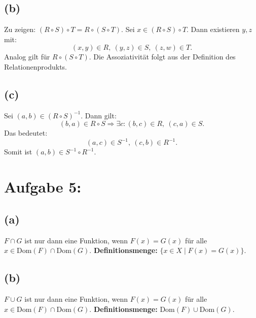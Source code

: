 \documentclass[a4paper]{scrartcl}
\begin{document}
\subsection*{(b)}
Zu zeigen: \((R \circ S) \circ T = R \circ (S \circ T)\).  
Sei \( x \in (R \circ S) \circ T \). Dann existieren \( y, z \) mit:
\[
(x, y) \in R, \ (y, z) \in S, \ (z, w) \in T.
\]
Analog gilt für \( R \circ (S \circ T) \). Die Assoziativität folgt aus der Definition des Relationenprodukts.

\subsection*{(c)}
Sei \( (a, b) \in (R \circ S)^{-1} \). Dann gilt:
\[
(b, a) \in R \circ S \Rightarrow \exists c: (b, c) \in R, \ (c, a) \in S.
\]
Das bedeutet:
\[
(a, c) \in S^{-1}, \ (c, b) \in R^{-1}.
\]
Somit ist \( (a, b) \in S^{-1} \circ R^{-1} \).

\section*{Aufgabe 5:}

\subsection*{(a)}
\( F \cap G \) ist nur dann eine Funktion, wenn \( F(x) = G(x) \) für alle \( x \in \text{Dom}(F) \cap \text{Dom}(G) \).  
\textbf{Definitionsmenge:} \( \{x \in X \mid F(x) = G(x)\} \).

\subsection*{(b)}
\( F \cup G \) ist nur dann eine Funktion, wenn \( F(x) = G(x) \) für alle \( x \in \text{Dom}(F) \cap \text{Dom}(G) \).  
\textbf{Definitionsmenge:} \( \text{Dom}(F) \cup \text{Dom}(G) \).
\end{document}
